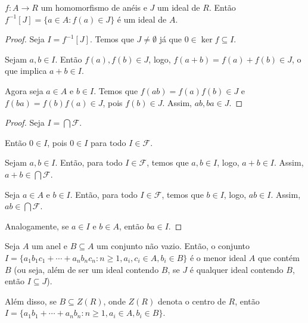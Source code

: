 \begin{prop}
    $f:A\rightarrow R$ um homomorfismo de anéis e $J$ um ideal de $R$.
    Então $f^{-1}[J]=\{a \in A: f(a) \in J\}$ é um ideal de $A$.
\end{prop}
\begin{proof}
    Seja $I=f^{-1}[J]$.
    Temos que $J\neq \emptyset$ já que $0 \in \ker f\subseteq I$.

    Sejam $a, b \in I$.
    Então $f(a), f(b) \in J$, logo, $f(a+b)=f(a)+f(b) \in J$, o que implica $a+b \in I$.

    Agora seja $a \in A$ e $b \in I$.
    Temos que $f(ab)=f(a)f(b)\in J$ e $f(ba)=f(b)f(a)\in J$, pois $f(b)\in J$.
    Assim, $ab, ba \in J$.
\end{proof}
\begin{proof}

    Seja $I=\bigcap \mathcal F$.

    Então $0 \in I$, pois $0 \in I$ para todo $I \in \mathcal F$.

    Sejam $a, b \in I$.
    Então, para todo $I \in \mathcal F$, temos que $a, b \in I$, logo, $a+b\in I$.
    Assim, $a+b\in \bigcap \mathcal F$.

    Seja $a \in A$ e $b \in I$.
    Então, para todo $I \in \mathcal F$, temos que $b \in I$, logo, $ab\in I$.
    Assim, $ab\in \bigcap \mathcal F$.

    Analogamente, se $a \in I$ e $b \in A$, então $ba\in I$.
\end{proof}

\begin{prop}
    Seja $A$ um anel e $B\subseteq A$ um conjunto não vazio.
    Então, o conjunto $I=\{a_1b_1c_1+\cdots+a_nb_nc_n: n\geq 1, a_i, c_i \in A, b_i \in B\}$ é o menor ideal $A$ que contém $B$ (ou seja, além de ser um ideal contendo $B$, se $J$ é qualquer ideal contendo $B$, então $I\subseteq J$).

    Além disso, se $B\subseteq Z(R)$, onde $Z(R)$ denota o centro de $R$, então $I=\{a_1b_1+\cdots+a_nb_n: n\geq 1, a_i \in A, b_i \in B\}$.
\end{prop}


